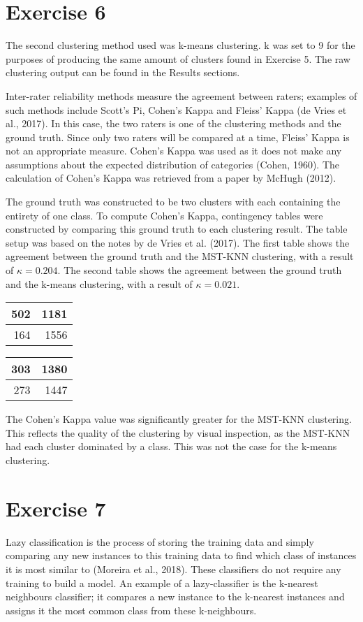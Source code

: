 \documentclass[11pt, a4paper]{article}
\begin{document}
\section{Exercise 6}
The second clustering method used was k-means clustering. k was set to 9 for the purposes of producing the same amount of clusters found in Exercise 5. The raw clustering output can be found in the Results sections.

Inter-rater reliability methods measure the agreement between raters; examples of such methods include Scott's Pi, Cohen's Kappa and Fleiss' Kappa (de Vries et al., 2017). In this case, the two raters is one of the clustering methods and the ground truth. Since only two raters will be compared at a time, Fleiss' Kappa is not an appropriate measure. Cohen's Kappa was used as it does not make any assumptions about the expected distribution of categories (Cohen, 1960). The calculation of Cohen's Kappa was retrieved from a paper by McHugh (2012).

The ground truth was constructed to be two clusters with each containing the entirety of one class. To compute Cohen's Kappa, contingency tables were constructed by comparing this ground truth to each clustering result. The table setup was based on the notes by de Vries et al. (2017). The first table shows the agreement between the ground truth and the MST-KNN clustering, with a result of $\kappa = 0.204$. The second table shows the agreement between the ground truth and the k-means clustering, with a result of $\kappa = 0.021$.

\begin{center}
\begin{tabular}{|r|r|}
\hline
502 & 1181\\
\hline
164 & 1556\\
\hline
\end{tabular}
\qquad
\begin{tabular}{|r|r|}
\hline
303 & 1380\\
\hline
273 & 1447\\
\hline
\end{tabular}
\end{center}

The Cohen's Kappa value was significantly greater for the MST-KNN clustering. This reflects the quality of the clustering by visual inspection, as the MST-KNN had each cluster dominated by a class. This was not the case for the k-means clustering.

\section{Exercise 7}
Lazy classification is the process of storing the training data and simply comparing any new instances to this training data to find which class of instances it is most similar to (Moreira et al., 2018). These classifiers do not require any training to build a model. An example of a lazy-classifier is the k-nearest neighbours classifier; it compares a new instance to the k-nearest instances and assigns it the most common class from these k-neighbours.
\end{document}

